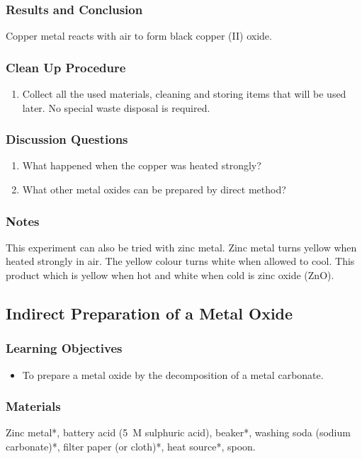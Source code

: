 \subsubsection*{Results and Conclusion}
Copper metal reacts with air to form black copper (II) oxide.

\subsubsection*{Clean Up Procedure}
\begin{enumerate}
\item{Collect all the used materials, cleaning and storing items that will be used later. No special waste disposal is required.}
\end{enumerate}

\subsubsection*{Discussion Questions}
\begin{enumerate}
\item{What happened when the copper was heated strongly?}
\item{What other metal oxides can be prepared by direct method?}
\end{enumerate}
\subsubsection*{Notes}
This experiment can also be tried with zinc metal. Zinc metal turns yellow when heated strongly in air. The yellow colour turns white when allowed to cool. This product which is yellow when hot and white when cold is zinc oxide (ZnO).

\subsection{Indirect Preparation of a Metal Oxide}

\subsubsection*{Learning Objectives}
\begin{itemize}
\item{To prepare a metal oxide by the decomposition of a metal carbonate.}
\end{itemize}

\subsubsection*{Materials}
Zinc metal*, battery acid (5~M sulphuric acid), beaker*, washing soda (sodium carbonate)*, filter paper (or cloth)*, heat source*, spoon.

